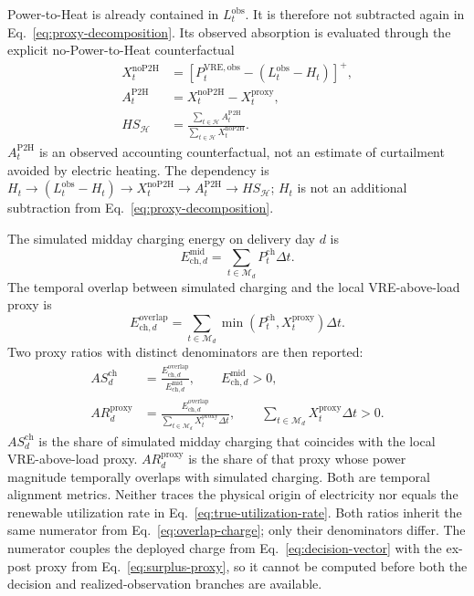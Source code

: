 \documentclass[11pt,a4paper]{article}
\begin{document}
Power-to-Heat is already contained in $L^{\mathrm{obs}}_t$.  It is therefore
not subtracted again in Eq.~\eqref{eq:proxy-decomposition}.  Its observed
absorption is evaluated through the explicit no-Power-to-Heat counterfactual
\begin{align}
  X^{\mathrm{noP2H}}_t
  &=\left[P^{\mathrm{VRE,obs}}_t-
  (L^{\mathrm{obs}}_t-H_t)\right]^+,
  \label{eq:no-p2h-proxy}\\
  A^{\mathrm{P2H}}_t
  &=X^{\mathrm{noP2H}}_t-X^{\mathrm{proxy}}_t,
  \label{eq:p2h-absorption}\\
  HS_{\mathcal{H}}
  &=\frac{\sum_{t\in\mathcal{H}}A^{\mathrm{P2H}}_t}
  {\sum_{t\in\mathcal{H}}X^{\mathrm{noP2H}}_t}.
  \label{eq:p2h-share}
\end{align}
$A^{\mathrm{P2H}}_t$ is an observed accounting counterfactual, not an estimate
of curtailment avoided by electric heating.  The dependency is
$H_t\rightarrow(L^{\mathrm{obs}}_t-H_t)\rightarrow
X^{\mathrm{noP2H}}_t\rightarrow A^{\mathrm{P2H}}_t\rightarrow HS_{\mathcal H}$;
$H_t$ is not an additional subtraction from Eq.~\eqref{eq:proxy-decomposition}.

The simulated midday charging energy on delivery day $d$ is
\begin{equation}
  E^{\mathrm{mid}}_{\mathrm{ch},d}
  =\sum_{t\in\mathcal{M}_d}P^{\mathrm{ch}}_t\Delta t.
  \label{eq:midday-charge}
\end{equation}
The temporal overlap between simulated charging and the local VRE-above-load proxy is
\begin{equation}
  E^{\mathrm{overlap}}_{\mathrm{ch},d}
  =\sum_{t\in\mathcal{M}_d}
  \min\!\left(P^{\mathrm{ch}}_t,X^{\mathrm{proxy}}_t\right)\Delta t.
  \label{eq:overlap-charge}
\end{equation}
Two proxy ratios with distinct denominators are then reported:
\begin{align}
  AS^{\mathrm{ch}}_d
  &=\frac{E^{\mathrm{overlap}}_{\mathrm{ch},d}}
  {E^{\mathrm{mid}}_{\mathrm{ch},d}},
  \qquad E^{\mathrm{mid}}_{\mathrm{ch},d}>0,
  \label{eq:alignment-share}\\
  AR^{\mathrm{proxy}}_d
  &=\frac{E^{\mathrm{overlap}}_{\mathrm{ch},d}}
  {\displaystyle\sum_{t\in\mathcal{M}_d}X^{\mathrm{proxy}}_t\Delta t},
  \qquad \sum_{t\in\mathcal{M}_d}X^{\mathrm{proxy}}_t\Delta t>0.
  \label{eq:proxy-absorption-ratio}
\end{align}
$AS^{\mathrm{ch}}_d$ is the share of simulated midday charging that coincides with the local VRE-above-load proxy. $AR^{\mathrm{proxy}}_d$ is the share of that proxy whose power magnitude temporally overlaps with simulated charging. Both are temporal alignment metrics. Neither traces the physical origin of electricity nor equals the renewable utilization rate in Eq.~\eqref{eq:true-utilization-rate}.
Both ratios inherit the same numerator from Eq.~\eqref{eq:overlap-charge}; only
their denominators differ.  The numerator couples the deployed charge from
Eq.~\eqref{eq:decision-vector} with the ex-post proxy from
Eq.~\eqref{eq:surplus-proxy}, so it cannot be computed before both the decision
and realized-observation branches are available.
\end{document}
